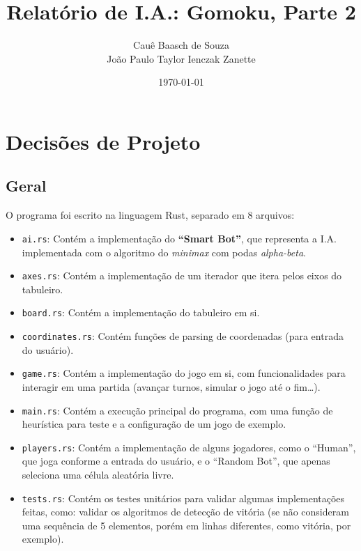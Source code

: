 \documentclass{article}
\title{Relatório de I.A.: Gomoku, Parte 2}
\author{Cauê Baasch de Souza \\
        João Paulo Taylor Ienczak Zanette}
\date{\today}
\begin{document}
    \maketitle{}

    \section{Decisões de Projeto}

    \subsection{Geral}

    O programa foi escrito na linguagem Rust, separado em 8 arquivos:

    \begin{itemize}
        \item \texttt{ai.rs}: Contém a implementação do \textbf{``Smart Bot''},
            que representa a I.A. implementada com o algoritmo do
            \textit{minimax} com podas \textit{alpha-beta}.
        \item \texttt{axes.rs}: Contém a implementação de um iterador que itera
            pelos eixos do tabuleiro.
        \item \texttt{board.rs}: Contém a implementação do tabuleiro em si.
        \item \texttt{coordinates.rs}: Contém funções de parsing de coordenadas
            (para entrada do usuário).
        \item \texttt{game.rs}: Contém a implementação do jogo em si, com
            funcionalidades para interagir em uma partida (avançar turnos,
            simular o jogo até o fim\ldots).
        \item \texttt{main.rs}: Contém a execução principal do programa, com
            uma função de heurística para teste e a configuração de um jogo de
            exemplo.
        \item \texttt{players.rs}: Contém a implementação de alguns jogadores,
            como o ``Human'', que joga conforme a entrada do usuário, e o
            ``Random Bot'', que apenas seleciona uma célula aleatória livre.
        \item \texttt{tests.rs}: Contém os testes unitários para validar
            algumas implementações feitas, como: validar os algoritmos de
            detecção de vitória (se não consideram uma sequência de 5
            elementos, porém em linhas diferentes, como vitória, por exemplo).
    \end{itemize}
\end{document}
